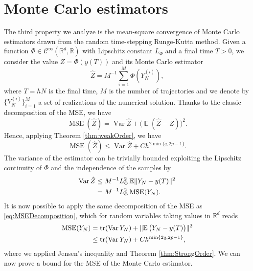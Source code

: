\documentclass{siamart1116}
\numberwithin{theorem}{section}
\DeclarePairedDelimiter{\norm}{\|}{\|}
\newcommand{\R}{\mathbb{R}}
\newcommand{\Var}{\operatorname{Var}}
\newcommand{\E}{\operatorname{\mathbb{E}}}
\newcommand{\MSE}{\operatorname{MSE}}
\newcommand{\trace}{\operatorname{tr}}
\newcommand{\sksum}{\textstyle\sum}
\begin{document}
\section{Monte Carlo estimators}\label{sec:MonteCarlo}

The third property we analyze is the mean-square convergence of Monte Carlo estimators drawn from the random time-stepping Runge-Kutta method. Given a function $\Phi\in\mathcal{C}^\infty(\R^d, \R)$ with Lipschitz constant $L_\Phi$ and a final time $T > 0$, we consider the value $Z = \Phi(y(T))$ and its Monte Carlo estimator 
\begin{equation}\label{eq:MSE}
	\hat Z = M^{-1} \sksum_{i = 1}^M \Phi(Y_N^{(i)}),
\end{equation}
where $T = hN$ is the final time, $M$ is the number of trajectories and we denote by $\{Y_N^{(i)}\}_{i=1}^M$ a set of realizations of the numerical solution. Thanks to the classic decomposition of the MSE, we have
\begin{equation}\label{eq:MSEDecomposition}
	\MSE(\hat Z) = \Var \hat Z  + \big(\E(\hat Z - Z)\big)^2.
\end{equation}
Hence, applying Theorem \ref{thm:weakOrder}, we have
\begin{equation}\label{eq:MSEWeakOrder}
	\MSE(\hat Z) \leq \Var \hat Z  + Ch^{2\min\{q, 2p - 1\}}.
\end{equation}
The variance of the estimator can be trivially bounded exploiting the Lipschitz continuity of $\Phi$ and the independence of the samples by
\begin{equation}\label{eq:MSELipschitz}
\begin{aligned}
	\Var\hat Z &\leq M^{-1} L_\Phi^2 \E \norm{Y_N - y(T)}^2 \\
    &= M^{-1} L_\Phi^2 \MSE(Y_N).
\end{aligned}
\end{equation}
It is now possible to apply the same decomposition of the MSE as \eqref{eq:MSEDecomposition}, which for random variables taking values in $\R^d$ reads
\begin{equation}\label{eq:MSEStrongOrder}
\begin{aligned}
	\MSE(Y_N) &= \trace(\Var Y_N) + \norm{\E\big(Y_N - y(T)\big)}^2\\
    &\leq \trace(\Var Y_N) + Ch^{\min\{2q, 2p -1\}},
\end{aligned}
\end{equation}
where we applied Jensen's inequality and Theorem \ref{thm:StrongOrder}. We can now prove a bound for the MSE of the Monte Carlo estimator.
\end{document}
